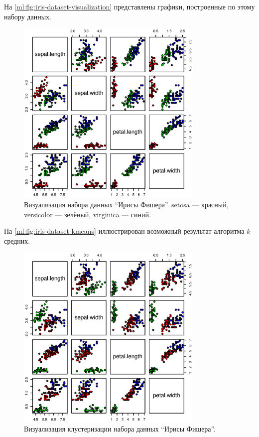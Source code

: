 На \autoref{ml:fig:iris-dataset-visualization} представлены графики, построенные по этому набору данных.

\begin{figure}[tb]
  \begin{center}
    \leavevmode
    \includegraphics[width=0.8\textwidth]{images/ml/iris-flower-dataset}
  \end{center}
  \caption{Визуализация набора данных ``Ирисы Фишера''. setosa — красный, versicolor — зелёный, virginica — синий.}
  \label{ml:fig:iris-dataset-visualization}
\end{figure}

На \autoref{ml:fig:iris-dataset-kmeans} иллюстрирован возможный результат алгоритма $k$ средних.

\begin{figure}[tb]
  \begin{center}
    \leavevmode
    \includegraphics[width=0.8\textwidth]{images/ml/iris-flower-kmeans}
  \end{center}
  \caption{Визуализация клустеризации набора данных ``Ирисы Фишера''.}
  \label{ml:fig:iris-dataset-kmeans}
\end{figure}
